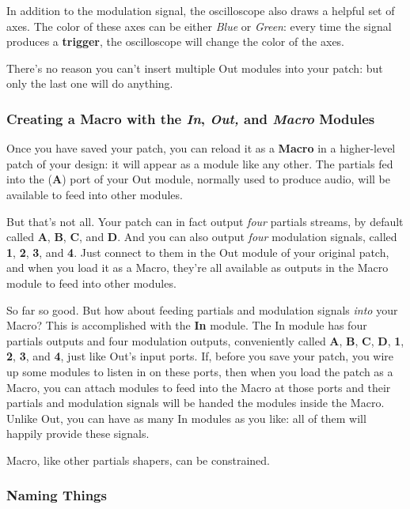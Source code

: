 \documentclass{article}
\begin{document}
In addition to the modulation signal, the oscilloscope also draws a helpful set of axes.  The color of these axes can be either {\it Blue} or {\it Green}: every time the signal produces a {\bf trigger}, the oscilloscope will change the color of the axes.

There's no reason you can't insert multiple Out modules into your patch: but only the last one will do anything.

\subsubsection{Creating a Macro with the \textit{In}, \textit{Out,} and \textit{Macro} Modules}
\label{creatingmacros}

Once you have saved your patch, you can reload it as a {\bf Macro} in a higher-level patch of your design: it will appear as a module like any other.  The partials fed into the ({\bf A}) port of your Out module, normally used to produce audio, will be available to feed into other modules.

But that's not all.  Your patch can in fact output {\it four} partials streams, by default called {\bf A}, {\bf B}, {\bf C}, and {\bf D}.  And you can also output {\it four} modulation signals, called {\bf 1}, {\bf 2}, {\bf 3}, and {\bf 4}.  Just connect to them in the Out module of your original patch, and when you load it as a Macro, they're all available as outputs in the Macro module to feed into other modules. 

So far so good.  But how about feeding partials and modulation signals {\it into} your Macro?  This is accomplished with the {\bf In} module.  The In module has four partials outputs and four modulation outputs, conveniently called {\bf A}, {\bf B}, {\bf C}, {\bf D}, {\bf 1}, {\bf 2}, {\bf 3}, and {\bf 4}, just like Out's input ports.  If, before you save your patch, you wire up some modules to listen in on these ports, then when you load the patch as a Macro, you can attach modules to feed into the Macro at those ports and their partials and modulation signals will be handed the modules inside the Macro.  Unlike Out, you can have as many In modules as you like: all of them will happily provide these signals.

Macro, like other partials shapers, can be constrained.

\subsubsection{Naming Things}
\end{document}
